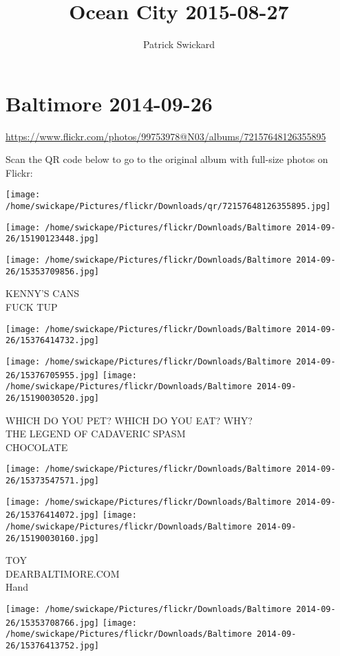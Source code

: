 \documentclass[10pt,letterpaper]{article}
\title{Ocean City 2015-08-27}
\author{Patrick Swickard}
\date{}
\begin{document}
\section*{Baltimore 2014-09-26}

\url{https://www.flickr.com/photos/99753978@N03/albums/72157648126355895}

Scan the QR code below to go to the original album with full-size photos on Flickr:

\texttt{[image: /home/swickape/Pictures/flickr/Downloads/qr/72157648126355895.jpg]}
\pagebreak

\texttt{[image: /home/swickape/Pictures/flickr/Downloads/Baltimore 2014-09-26/15190123448.jpg]}

\vspace{0.25in}
\texttt{[image: /home/swickape/Pictures/flickr/Downloads/Baltimore 2014-09-26/15353709856.jpg]}

KENNY'S CANS\\
FUCK TUP
\pagebreak

\texttt{[image: /home/swickape/Pictures/flickr/Downloads/Baltimore 2014-09-26/15376414732.jpg]}

\vspace{0.25in}
\texttt{[image: /home/swickape/Pictures/flickr/Downloads/Baltimore 2014-09-26/15376705955.jpg]}
\texttt{[image: /home/swickape/Pictures/flickr/Downloads/Baltimore 2014-09-26/15190030520.jpg]}

WHICH DO YOU PET?  WHICH DO YOU EAT?  WHY?\\
THE LEGEND OF CADAVERIC SPASM\\
CHOCOLATE
\pagebreak

\texttt{[image: /home/swickape/Pictures/flickr/Downloads/Baltimore 2014-09-26/15373547571.jpg]}

\vspace{0.25in}
\texttt{[image: /home/swickape/Pictures/flickr/Downloads/Baltimore 2014-09-26/15376414072.jpg]}
\texttt{[image: /home/swickape/Pictures/flickr/Downloads/Baltimore 2014-09-26/15190030160.jpg]}

TOY\\
DEARBALTIMORE.COM\\
Hand
\pagebreak

\texttt{[image: /home/swickape/Pictures/flickr/Downloads/Baltimore 2014-09-26/15353708766.jpg]}
\texttt{[image: /home/swickape/Pictures/flickr/Downloads/Baltimore 2014-09-26/15376413752.jpg]}
\end{document}
